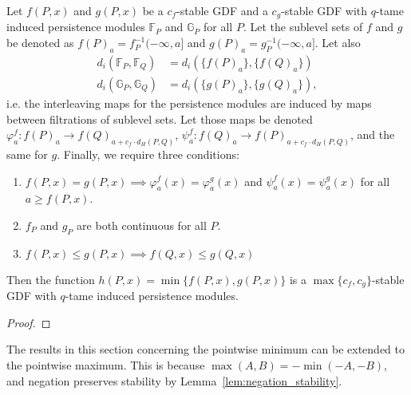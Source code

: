 
\begin{theorem}
    Let $f(P, x)$ and $g(P, x)$ be a $c_f$-stable GDF and a
    $c_g$-stable GDF with $q$-tame induced persistence modules $\mathbb{F}_P$ and
    $\mathbb{G}_P$ for all $P$. Let the sublevel sets of $f$ and $g$ be
    denoted as $f(P)_a = f^{-1}_P(-\infty, a]$ and
    $g(P)_a = g^{-1}_P(-\infty, a]$.
    Let also
    \begin{align}
        d_i(\mathbb{F}_P, \mathbb{F}_Q) &= d_i(\{f(P)_a\}, \{f(Q)_a\}) \\
        d_i(\mathbb{G}_P, \mathbb{G}_Q) &= d_i(\{g(P)_a\}, \{g(Q)_a\}),
    \end{align}
    i.e. the interleaving maps for the persistence modules are induced by maps
    between filtrations of sublevel sets.
    Let those maps be denoted $\varphi^f_a : f(P)_a \to f(Q)_{a + c_f \cdot d_H(P, Q)}$,
    $\psi^f_a : f(Q)_a \to f(P)_{a + c_f \cdot d_H(P, Q)}$, and the same for $g$.
    Finally, we require three conditions:
    \begin{enumerate}
        \item $f(P, x) = g(P, x) \implies \varphi_a^f(x) = \varphi_a^g(x)$
        and $\psi_a^f(x) = \psi_a^g(x)$ for all $a \geq f(P, x)$.
        \item $f_P$ and $g_P$ are both continuous for all $P$.
        \item $f(P, x) \leq g(P, x) \implies f(Q, x) \leq g(Q, x)$
    \end{enumerate}
    Then the function $h(P, x) = \min\{f(P, x), g(P, x)\}$ is
    a $\max\{c_f, c_g\}$-stable GDF with $q$-tame induced persistence modules.
\end{theorem}
\begin{proof}
    \todo{}
\end{proof}

The results in this section concerning the pointwise minimum can be extended to
the pointwise maximum.
This is because $\max(A, B) = - \min( - A, - B)$, and negation preserves
stability by Lemma~\ref{lem:negation_stability}.
